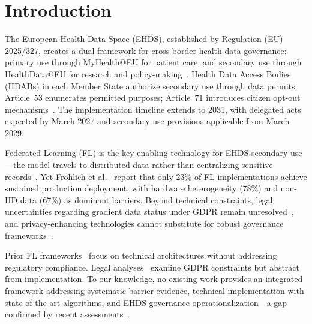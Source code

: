 \documentclass[conference]{IEEEtran}
\begin{document}
\section{Introduction}
\label{sec:introduction}

The European Health Data Space (EHDS), established by Regulation (EU) 2025/327, creates a dual framework for cross-border health data governance: primary use through MyHealth@EU for patient care, and secondary use through HealthData@EU for research and policy-making~\cite{eu2025ehds}. Health Data Access Bodies (HDABs) in each Member State authorize secondary use through data permits; Article~53 enumerates permitted purposes; Article~71 introduces citizen opt-out mechanisms~\cite{staunton2024ethical}. The implementation timeline extends to 2031, with delegated acts expected by March 2027 and secondary use provisions applicable from March 2029.

Federated Learning (FL) is the key enabling technology for EHDS secondary use---the model travels to distributed data rather than centralizing sensitive records~\cite{mcmahan2017communication, kairouz2021advances}. Yet Fr\"ohlich et al.~\cite{frohlich2025reality} report that only 23\% of FL implementations achieve sustained production deployment, with hardware heterogeneity (78\%) and non-IID data (67\%) as dominant barriers. Beyond technical constraints, legal uncertainties regarding gradient data status under GDPR remain unresolved~\cite{quinn2024gdpr}, and privacy-enhancing technologies cannot substitute for robust governance frameworks~\cite{vandrumpt2025pets}.

Prior FL frameworks~\cite{rieke2020future, beutel2023flower, nvflare2023} focus on technical architectures without addressing regulatory compliance. Legal analyses~\cite{quinn2024gdpr, staunton2024ethical} examine GDPR constraints but abstract from implementation. To our knowledge, no existing work provides an integrated framework addressing systematic barrier evidence, technical implementation with state-of-the-art algorithms, and EHDS governance operationalization---a gap confirmed by recent assessments~\cite{chaverodiez2026fair, teo2024systematic}.
\end{document}
